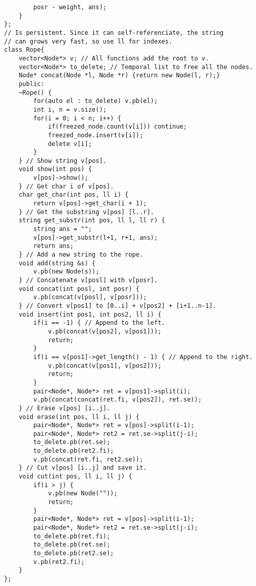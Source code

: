\documentclass[a4paper]{article}
\begin{document}
\begin{multicols}{2}
\begin{verbatim}
        posr - weight, ans);
    }
};
// Is persistent. Since it can self-referenciate, the string
// can grows very fast, so use ll for indexes.
class Rope{ 
    vector<Node*> v; // All functions add the root to v.
    vector<Node*> to_delete; // Temporal list to free all the nodes.
    Node* concat(Node *l, Node *r) {return new Node(l, r);}
    public:
    ~Rope() {
        for(auto el : to_delete) v.pb(el);
        int i, n = v.size();
        for(i = 0; i < n; i++) {
            if(freezed_node.count(v[i])) continue;
            freezed_node.insert(v[i]);
            delete v[i];
        }
    } // Show string v[pos].
    void show(int pos) {
        v[pos]->show();
    } // Get char i of v[pos]. 
    char get_char(int pos, ll i) {
        return v[pos]->get_char(i + 1);
    } // Get the substring v[pos] [l..r].
    string get_substr(int pos, ll l, ll r) {
        string ans = "";
        v[pos]->get_substr(l+1, r+1, ans);
        return ans;
    } // Add a new string to the rope.
    void add(string &s) {
        v.pb(new Node(s));
    } // Concatenate v[posl] with v[posr].
    void concat(int posl, int posr) {
        v.pb(concat(v[posl], v[posr]));
    } // Convert v[pos1] to [0..i] + v[pos2] + [i+1..n-1].
    void insert(int pos1, int pos2, ll i) {
        if(i == -1) { // Append to the left.
            v.pb(concat(v[pos2], v[pos1]));
            return;
        }
        if(i == v[pos1]->get_length() - 1) { // Append to the right.
            v.pb(concat(v[pos1], v[pos2]));
            return;
        }
        pair<Node*, Node*> ret = v[pos1]->split(i);
        v.pb(concat(concat(ret.fi, v[pos2]), ret.se));
    } // Erase v[pos] [i..j].
    void erase(int pos, ll i, ll j) {
        pair<Node*, Node*> ret = v[pos]->split(i-1);
        pair<Node*, Node*> ret2 = ret.se->split(j-i);
        to_delete.pb(ret.se);
        to_delete.pb(ret2.fi);
        v.pb(concat(ret.fi, ret2.se));
    } // Cut v[pos] [i..j] and save it.
    void cut(int pos, ll i, ll j) {
        if(i > j) {
            v.pb(new Node(""));
            return;
        }
        pair<Node*, Node*> ret = v[pos]->split(i-1);
        pair<Node*, Node*> ret2 = ret.se->split(j-i);
        to_delete.pb(ret.fi);
        to_delete.pb(ret.se);
        to_delete.pb(ret2.se);
        v.pb(ret2.fi);
    }
};
\end{verbatim}
\end{multicols}
\end{document}
